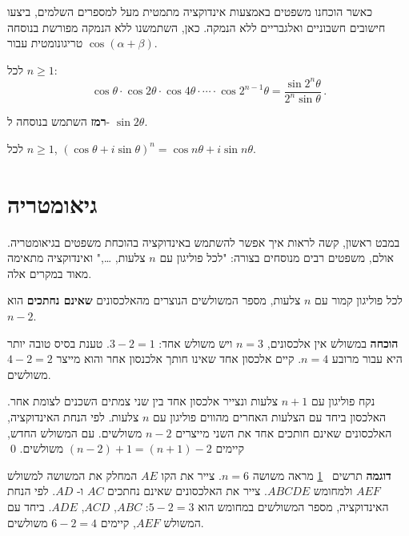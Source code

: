 
כאשר הוכחנו משפטים באמצעות אינדוקציה מתמטית מעל למספרים השלמים, ביצעו חישובים חשבוניים ואלגבריים ללא הנמקה. כאן, השתמשנו ללא הנמקה מפורשת בנוסחה טריגונומטית עבור 
$\cos (\alpha+\beta)$.

\begin{exercise}
לכל
$n\geq 1$:
\[
\cos\theta \cdot \cos 2\theta \cdot \cos 4\theta \cdot \cdots \cdot \cos 2^{n-1}\theta = \frac{\sin 2^n\theta}{2^n \sin \theta}\,.
\]
\end{exercise}
\textbf{רמז} 
השתמש בנוסחה ל-%
$\sin 2\theta$.

\begin{exercise}
לכל
$n\geq 1$, $(\cos \theta + i\sin\theta)^n = \cos n\theta + i\sin n\theta$.
\end{exercise}

\section{%
גיאומטריה
}

במבט ראשון, קשה לראות איך אפשר להשתמש באינדוקציה בהוכחת משפטים בגיאומטריה. אולם, משפטים רבים מנוסחים בצורה: "לכל פוליגון עם
$n$
צלעות,
\ldots,"
ואינדוקציה מתאימה מאוד במקרים אלה.
\begin{theorem}\label{t.diag}
לכל פוליגון קמור עם
$n$
צלעות, מספר המשולשים הנוצרים מהאלכסונים
\textbf{שאינם נחתכים}
הוא
$n-2$.
\end{theorem}

\textbf{הוכחה}
במשולש אין אלכסונים, 
$n=3$
ויש משולש אחד:
$3-2=1$.
טענת בסיס טובה יותר היא עבור מרובע 
$n=4$.
קיים אלכסון אחד שאינו חותך אלכנסון אחר והוא מייצר
$4-2=2$
משולשים.

נקח פוליגון עם
$n+1$
צלעות ונצייר אלכסון אחד בין שני צמתים השכנים לצומת אחר. האלכסון ביחד עם הצלעות האחרים מהווים פוליגון עם
$n$
צלעות. לפי הנחת האינדוקציה, האלכסונים שאינם חותכים אחד את השני מייצרים 
$n-2$
משולשים. עם המשולש החדש, קיימים
$(n-2)+1=(n+1)-2$
משולשים.
\qed

\textbf{דוגמה}
תרשים~%
\ref{fig.diag}
מראה משושה 
$n=6$.
צייר את הקו
$AE$
המחלק את המשושה למשולש
$AEF$
ולמחומש
$ABCDE$.
צייר את האלכסונים שאינם נחתכים
$AC$
ו-
$AD$.
לפי הנחת האינדוקציה, מספר המשולשים במחומש הוא
$5-2=3$: $ABC$, $ACD$, $ADE$.
ביחד עם המשולש
$AEF$,
קיימים
$6-2=4$
משולשים.

\begin{figure}[t]
\begin{center}
\caption{
}\label{fig.diag}
\end{center}
\end{figure}

